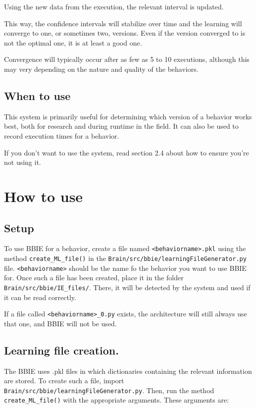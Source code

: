 \documentclass[a4paper, 12pt, oneside]{report}
\begin{document}
Using the new data from the execution, the relevant interval is updated.

This way, the confidence intervals will stabilize over time and the learning will converge to one, or sometimes two, versions.
Even if the version converged to is not the optimal one, it is at least a good one.

Convergence will typically occur after as few as 5 to 10 executions, although this may very depending on the nature and quality of the behaviors.

\section{When to use}

This system is primarily useful for determining which version of a behavior works best, both for research and during runtime in the field.
It can also be used to record execution times for a behavior.

If you don't want to use the system, read section 2.4 about how to ensure you're not using it.

\chapter{How to use}

\section{Setup}

To use BBIE for a behavior, create a file named \verb=<behaviorname>.pkl= using the method \verb=create_ML_file()= in the \verb=Brain/src/bbie/learningFileGenerator.py= file.
\verb=<behaviorname>= should be the name fo the behavior you want to use BBIE for.
Once such a file has been created, place it in the folder \verb=Brain/src/bbie/IE_files/=.
There, it will be detected by the system and used if it can be read correctly.

If a file called \verb=<behaviorname>_0.py= exists, the architecture will still always use that one, and BBIE will not be used.

\section{Learning file creation.}

The BBIE uses .pkl files in which dictionaries containing the relevant information are stored.
To create such a file, import \verb=Brain/src/bbie/learningFileGenerator.py=.
Then, run the method \verb=create_ML_file()= with the appropriate arguments.
These arguments are:
\end{document}
